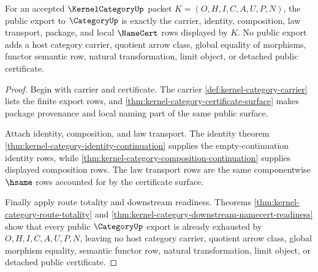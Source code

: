 \begin{theorem}
\label{thm:kernel-category-categoryup-public-export-lock}
For an accepted $\KernelCategoryUp$ packet $K=(O,H,I,C,A,U,P,N)$, the public export to $\CategoryUp$ is exactly the carrier, identity, composition, law transport, package, and local $\NameCert$ rows displayed by $K$. No public export adds a host category carrier, quotient arrow class, global equality of morphisms, functor semantic row, natural transformation, limit object, or detached public certificate.
\end{theorem}
\begin{proof}
Begin with carrier and certificate. The carrier \autoref{def:kernel-category-carrier} lists the finite export rows, and \autoref{thm:kernel-category-certificate-surface} makes package provenance and local naming part of the same public surface.

Attach identity, composition, and law transport. The identity theorem \autoref{thm:kernel-category-identity-continuation} supplies the empty-continuation identity rows, while \autoref{thm:kernel-category-composition-continuation} supplies displayed composition rows. The law transport rows are the same componentwise $\hsame$ rows accounted for by the certificate surface.

Finally apply route totality and downstream readiness. Theorems \autoref{thm:kernel-category-route-totality} and \autoref{thm:kernel-category-downstream-namecert-readiness} show that every public $\CategoryUp$ export is already exhausted by $O,H,I,C,A,U,P,N$, leaving no host category carrier, quotient arrow class, global morphism equality, semantic functor row, natural transformation, limit object, or detached public certificate.
\end{proof}

